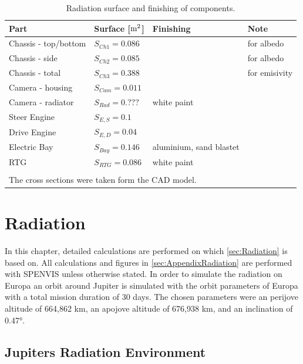 \begin{table}[H]
	\centering
	\caption{Radiation surface and finishing of components.}
	\begin{tabular}{l@{\qquad}l@{\qquad}ll}
		\hline
		Part  & Surface [${\rm m}^2$] & Finishing & Note \\ \hline
		Chassis - top/bottom & $S_{Ch1}=0.086$ & & for albedo\\
		Chassis - side & $S_{Ch2}=0.085$ & & for albedo\\
		Chassis - total & $S_{Ch3}=0.388$ & & for emisivity\\
		Camera - housing & $S_{Cam}=0.011$ & &\\
		Camera - radiator & $S_{Rad}=0.???$ & white paint &  \\
		Steer Engine& $S_{E,S}=0.1$ & & \\
		Drive Engine& $S_{E,D}=0.04$ & & \\
		Electric Bay& $S_{Bay}=0.146$ & aluminium, sand blastet & \\
		RTG& $S_{RTG}=0.086$ & white paint & \\\hline
		&&& \\
		\multicolumn{3}{l}{The cross sections were taken form the CAD model.}
	\end{tabular}
	\label{tab:tcs_surf}
\end{table}

\clearpage

\setcounter{figure}{0}
\setcounter{table}{0}

\section{Radiation}

\label{sec:AppendixRadiation}

In this chapter, detailed calculations are performed on which \autoref{sec:Radiation} is based on. All calculations and figures in \autoref{sec:AppendixRadiation} are performed with SPENVIS unless otherwise stated. In order to simulate the radiation on Europa an orbit around Jupiter is simulated with the orbit parameters of Europa with a total mission duration of 30 days. The chosen parameters were an perijove altitude of 664,862 km, an apojove altitude of 676,938 km, and an inclination of 0.47°.

\subsection{Jupiters Radiation Environment}

